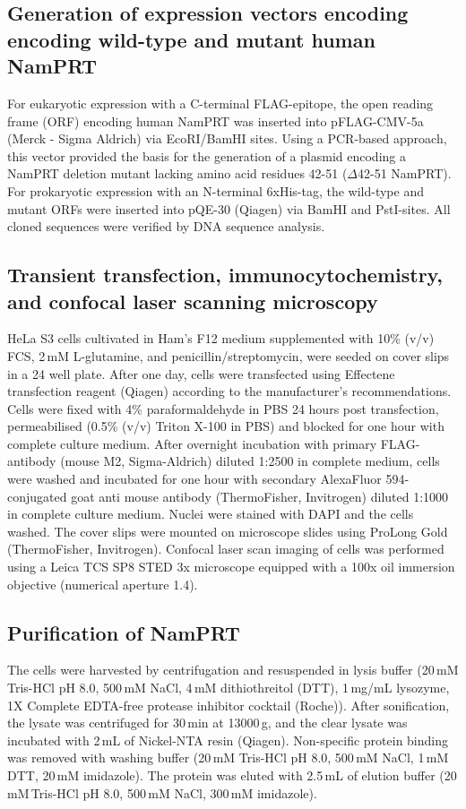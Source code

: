 \subsection{Generation of expression vectors encoding encoding wild-type and mutant human NamPRT}

For eukaryotic expression with a C-terminal FLAG-epitope, the open reading frame (ORF) encoding human NamPRT was inserted into pFLAG-CMV-5a (Merck - Sigma Aldrich) via EcoRI/BamHI sites. Using a PCR-based approach, this vector provided the basis for the generation of a plasmid encoding a NamPRT deletion mutant lacking amino acid residues 42-51 ($\Delta$42-51 NamPRT). For prokaryotic expression with an N-terminal 6xHis-tag, the wild-type and mutant ORFs were inserted into pQE-30 (Qiagen) via BamHI and PstI-sites. All cloned sequences were verified by DNA sequence analysis.


\subsection{Transient transfection, immunocytochemistry, and confocal laser scanning microscopy}

HeLa S3 cells cultivated in Ham’s F12 medium supplemented with 10\% (v/v) FCS, 2\,mM L-glutamine, and penicillin/streptomycin, were seeded on cover slips in a 24 well plate. After one day, cells were transfected using Effectene transfection reagent (Qiagen) according to the manufacturer’s recommendations. Cells were fixed with 4\% paraformaldehyde in PBS 24 hours post transfection, permeabilised (0.5\% (v/v) Triton X-100 in PBS) and blocked for one hour with complete culture medium. After overnight incubation with primary FLAG-antibody (mouse M2, Sigma-Aldrich) diluted 1:2500 in complete medium, cells were washed and incubated for one hour with secondary AlexaFluor 594-conjugated goat anti mouse antibody (ThermoFisher, Invitrogen) diluted 1:1000 in complete culture medium. Nuclei were stained with DAPI and the cells washed. The cover slips were mounted on microscope slides using ProLong Gold (ThermoFisher, Invitrogen). Confocal laser scan imaging of cells was performed using a Leica TCS SP8 STED 3x microscope equipped with a 100x oil immersion objective (numerical aperture 1.4).


\subsection{Purification of NamPRT}

The cells were harvested by centrifugation and resuspended in lysis buffer (20\,mM Tris-HCl pH 8.0, 500\,mM NaCl, 4\,mM dithiothreitol (DTT), 1\,mg/mL lysozyme, 1X Complete EDTA-free protease inhibitor cocktail (Roche)). After sonification, the lysate was centrifuged for 30\,min at 13000\,g, and the clear lysate was incubated with 2\,mL of Nickel-NTA resin (Qiagen). Non-specific protein binding was removed with washing buffer (20\,mM Tris-HCl pH 8.0, 500\,mM NaCl, 1\,mM DTT, 20\,mM imidazole). The protein was eluted with 2.5\,mL of elution buffer (20 mM\,Tris-HCl pH 8.0, 500\,mM NaCl, 300\,mM imidazole).

